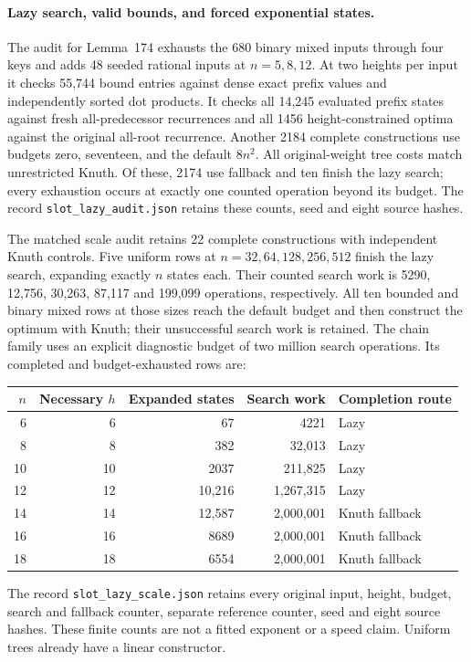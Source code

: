 \documentclass[11pt]{article}
\begin{document}
\paragraph{Lazy search, valid bounds, and forced exponential states.}
The audit for Lemma~174 exhausts the 680 binary
mixed inputs through four keys and adds 48 seeded rational inputs at
$n=5,8,12$. At two heights per input it checks 55,744 bound entries
against dense exact prefix values and independently sorted dot products.
It checks all 14,245 evaluated prefix states against fresh all-predecessor
recurrences and all 1456 height-constrained optima against the original
all-root recurrence. Another 2184 complete constructions use budgets
zero, seventeen, and the default $8n^2$. All original-weight tree costs
match unrestricted Knuth. Of these, 2174 use fallback and ten finish the
lazy search; every exhaustion occurs at exactly one counted operation
beyond its budget. The record \texttt{slot\_lazy\_audit.json} retains
these counts, seed and eight source hashes.

The matched scale audit retains 22 complete constructions with independent
Knuth controls. Five uniform rows at $n=32,64,128,256,512$ finish the lazy
search, expanding exactly $n$ states each. Their counted search work is
5290, 12,756, 30,263, 87,117 and 199,099 operations, respectively. All ten
bounded and binary mixed rows at those sizes reach the default budget
and then construct the optimum with Knuth; their unsuccessful search work
is retained. The chain family uses an explicit diagnostic budget of two
million search operations. Its completed and budget-exhausted rows are:
\begin{center}
\begin{tabular}{rrrrl}
\toprule
$n$ & Necessary $h$ & Expanded states & Search work & Completion route\\
\midrule
6 & 6 & 67 & 4221 & Lazy\\
8 & 8 & 382 & 32,013 & Lazy\\
10 & 10 & 2037 & 211,825 & Lazy\\
12 & 12 & 10,216 & 1,267,315 & Lazy\\
14 & 14 & 12,587 & 2,000,001 & Knuth fallback\\
16 & 16 & 8689 & 2,000,001 & Knuth fallback\\
18 & 18 & 6554 & 2,000,001 & Knuth fallback\\
\bottomrule
\end{tabular}
\end{center}
The record \texttt{slot\_lazy\_scale.json} retains every original input,
height, budget, search and fallback counter, separate reference counter,
seed and eight source hashes. These finite counts are not a fitted exponent
or a speed claim. Uniform trees already have a linear constructor.
\end{document}
